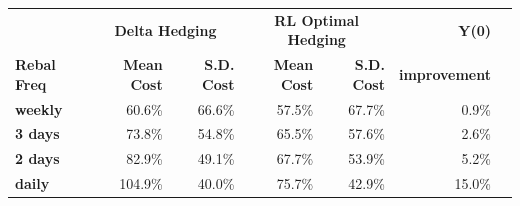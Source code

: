 \documentclass{article}
\begin{document}
\begin{table}[htbp]
\centering
\vspace{0.4em}
\begin{tabular}{lrrrrrr}
\hline
 & \multicolumn{2}{c}{\textbf{Delta Hedging}} & \multicolumn{2}{c}{\textbf{RL Optimal Hedging}} & \textbf{Y(0)} \\
\textbf{Rebal Freq} & \textbf{Mean Cost} & \textbf{S.D. Cost} & \textbf{Mean Cost} & \textbf{S.D. Cost} & \textbf{improvement} \\
\hline
\textbf{weekly} & 60.6\% & 66.6\% & 57.5\% & 67.7\% & 0.9\% \\
\textbf{3 days} & 73.8\% & 54.8\% & 65.5\% & 57.6\% & 2.6\% \\
\textbf{2 days} & 82.9\% & 49.1\% & 67.7\% & 53.9\% & 5.2\% \\
\textbf{daily} & 104.9\% & 40.0\% & 75.7\% & 42.9\% & 15.0\% \\
\hline
\end{tabular}
\end{table}
\end{document}
